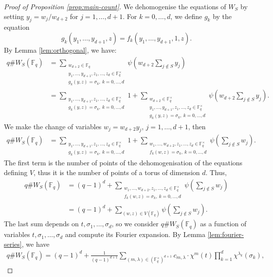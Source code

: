 \documentclass[10pt,a4paper]{amsart}
\newcommand{\F}{\mathbb{F}}
\begin{document}
\begin{proof}[Proof of Proposition \ref{prop:main-count}]
We dehomogenise the equations of $W_S$ by setting $y_j = w_{j}/w_{d+2}$ for $j=1,\dots,d+1$. For $k=0,\dots,d$, we define $g_k$ by the equation
\[
g_k(y_1,\dots,y_{d+1},z)= f_k(y_1,\dots,y_{d+1},1,z).
\]
By Lemma \ref{lem:orthogonal}, we have:
\begin{align*}
     q  \# W_{S} (\mathbb{F}_q)  &= \sum_{
     \substack{w_{d+2}\in \F_q \\ y_1,\dots,y_{d+1},z_1,\dots,z_d \in \F_q^{\times} \\ g_k(y,z)=\sigma_k, \ k=0,\dots,d }} \psi\left(w_{d+2}\sum_{j \notin S} y_j\right) \\
     &= \sum_{
     \substack{y_1,\dots,y_{d+1},z_1,\dots,z_d \in \F_q^{\times} \\ g_k(y,z)=\sigma_k, \ k=0,\dots,d}} 1 + \sum_{
     \substack{w_{d+2}\in \F_q^\times \\ y_1,\dots,y_{d+1},z_1,\dots,z_d \in \F_q^\times \\g_k(y,z)=\sigma_k, \ k=0,\dots,d}} \psi\left(w_{d+2}\sum_{j \notin S} y_j\right).
\end{align*}
We make the change of variables $w_j = w_{d+2}y_j$,  $j=1,\dots, d+1$, then
\begin{align*}
      q  \# W_{S} (\mathbb{F}_q)  &= \sum_{
     \substack{y_1,\dots,y_{d+1},z_1,\dots,z_d \in \F_q^{\times} \\ g_k(y,z)=\sigma_k, \ k=0,\dots,d}} 1 + \sum_{
     \substack{w_1,\dots, w_{d+2}, z_1, \dots, z_d \in \F_q^\times \\f_k(w,z)=\sigma_k, \ k=0,\dots,d}} \psi\left(\sum_{j\notin S} w_j\right)\!.
\end{align*}
The first term is the number of points of the dehomogenisation of the equations defining $V$, thus it is the number of points of a torus of dimension $d$. Thus, 
\begin{align*}
       q  \# W_{S} (\mathbb{F}_q)  &= (q-1)^{d} + \sum_{
     \substack{w_1,\dots, w_{d+2}, z_1, \dots, z_d \in \F_q^\times \\f_k(w,z)=\sigma_k, \ k=0,\dots,d}} \psi\left(\sum_{j\notin S} w_j\right)\!\\
    &= (q-1)^{d} + \sum_{(w,z) \in V(\F_q) } \psi\left(\sum_{j \notin S} w_j\right).
    \end{align*}
The last sum depends on $t, \sigma_1,\dots, \sigma_d$, so we consider $q \# W_{S}(\F_q)$ as a function of variables $t, \sigma_1,\dots, \sigma_d$ and compute its Fourier expansion.
By Lemma \ref{lem:fourier-series}, we have 
\begin{align*}
 q \# W_{S}(\F_q) = (q-1)^{d} + \frac{1}{ (q-1)^{d+1}}\sum_{(m,\lambda) \in \left(\F_q^{\times}\right)^{d+1}} c_{m,\lambda} \cdot   \chi^{m}(t) \prod_{k=1}^d \chi^{\lambda_k} (\sigma_k),

\end{align*}
\end{proof}
\end{document}
